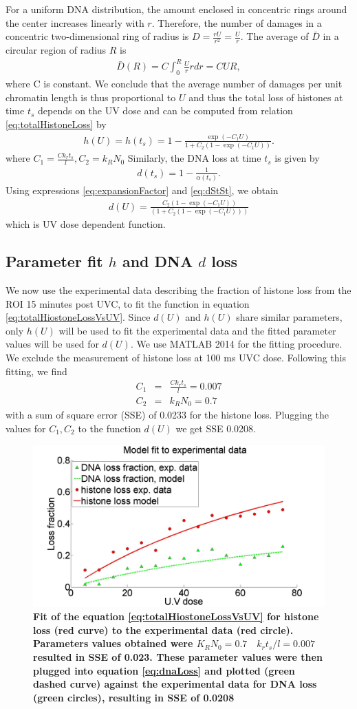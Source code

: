 \documentclass[12pt]{article}
\newcommand{\beq}{\begin{eqnarray}}
\newcommand{\eeq}{\end{eqnarray}}
\begin{document}
For a uniform DNA distribution, the amount enclosed in concentric rings around the center increases linearly with $r$. Therefore, the number of damages in a concentric two-dimensional ring of radius is ${D}= \frac{rU}{r^2}=\frac{U}{r}$. The average of $\bar{D}$ in a circular region of radius $R$ is
\beq
\bar{D}(R) = C\int_0^R \frac{U}{r} rdr = CUR,
\eeq
where C is constant. We conclude that the average number of damages per unit chromatin length is thus proportional to $U$ and thus the total loss of histones at time  $t_{s}$ depends on the UV dose and can be computed from relation \ref{eq:totalHistoneLoss} by
\beq\label{eq:totalHiostoneLossVsUV}
h(U)=h(t_s)=1-\frac{\exp(-C_1 U)}{ 1+C_2(1-\exp(-C_1 U))}.
\eeq
where $C_1=\frac{Ck_rt_s}{l}, C_2=k_RN_0$
Similarly, the DNA loss at time $t_{s}$ is given by 
\beq\label{eq:dStSt}
d(t_s)= 1-\frac1{\alpha(t_s)}. 
\eeq
Using expressions \ref{eq:expansionFactor} and \ref{eq:dStSt}, we obtain
\beq\label{eq:dnaLoss}
d(U)= \frac{C_2(1-\exp(-C_1 U))}{(1+C_2(1-\exp(-C_1 U)))}
\eeq
which is UV dose dependent function. 


\subsection{Parameter fit $h$ and DNA $d$ loss}\label{subsection:parameterFit}
We now use the experimental data describing the fraction of histone loss from the ROI 15 minutes post UVC, to fit the function in equation \ref{eq:totalHiostoneLossVsUV}. Since $d(U)$ and $h(U)$ share similar parameters, only $h(U)$ will be used to fit the experimental data and the fitted parameter values will be used for $d(U)$. We use MATLAB 2014 for the fitting procedure. We exclude the measurement of histone loss at 100 ms UVC dose. Following this fitting, we find
\beq
C_1 &=& \frac{Ck_rt_s}{l} = 0.007\\
C_2 &=& k_RN_0 = 0.7
\eeq
with a sum of square error (SSE) of 0.0233 for the histone loss. Plugging the values for $C_1,C_2$ to the function $d(U)$ we get SSE 0.0208. 

\begin{figure}[H]
\centering
\includegraphics[width=0.5\linewidth, height=0.3\textheight]{histoneAndDnaVsUvDoseModelFit}
\caption{\textbf{Fit of the equation \ref{eq:totalHiostoneLossVsUV} for histone loss (red curve) to the experimental data (red circle). Parameters values obtained were $K_RN_0 =0.7\quad k_rt_s/l=0.007$ resulted in SSE of 0.023. These parameter values were then plugged into equation \ref{eq:dnaLoss} and plotted (green dashed curve) against the experimental data for DNA loss (green circles), resulting in SSE of 0.0208}}
\label{fig:histoneAndDnaVsUvDoseModelFit}
\end{figure}
\end{document}
